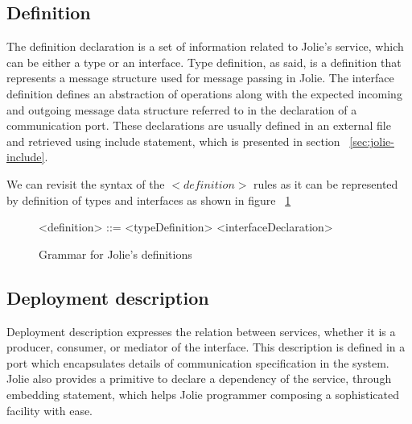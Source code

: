 \FloatBarrier

\subsection{Definition}
\label{sec:jolie-def}

The definition declaration is a set of information related to Jolie's service, which can be either a type or an interface. Type definition, as said, is a definition that represents a message structure used for message passing in Jolie. The interface definition defines an abstraction of operations along with the expected incoming and outgoing message data structure referred to in the declaration of a communication port. 
These declarations are usually defined in an external file and retrieved using include statement, which is presented in section ~\ref{sec:jolie-include}.





We can revisit the syntax of the \(<definition>\) rules as it can be represented by definition of types and interfaces as shown in figure ~\ref{fig:jolie-definition}

\begin{figure}[h]
    \begin{framed}
        \begin{grammar}
            <definition> ::= <typeDefinition>
            \alt <interfaceDeclaration>
        \end{grammar}
    \end{framed}
    \caption{Grammar for Jolie's definitions}
    \label{fig:jolie-definition}
\end{figure}

\subsection{Deployment description}

Deployment description expresses the relation between services, whether it is a producer, consumer, or mediator of the interface.
This description is defined in a port which encapsulates details of communication specification in the system.
Jolie also provides a primitive to declare a dependency of the service, through embedding statement, which helps Jolie programmer composing a sophisticated facility with ease.

